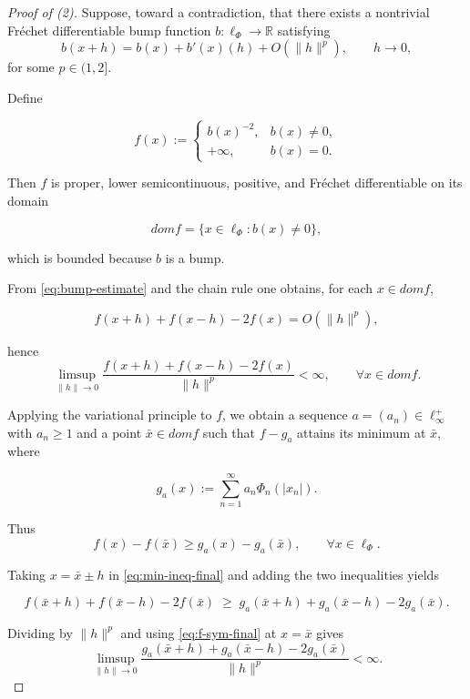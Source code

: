 \documentclass[12pt]{article}
\theoremstyle{thmstyleone}%
\theoremstyle{thmstyletwo}%
\theoremstyle{thmstylethree}%
\begin{document}
{ 

{%
  
\begin{proof}[Proof of (2)]
Suppose, toward a contradiction, that there exists a nontrivial
Fr\'echet differentiable bump function $b:\ell_\Phi\to\mathbb R$
satisfying
\begin{equation}\label{eq:bump-estimate}
  b(x+h)=b(x)+b'(x)(h)+O(\|h\|^p),
  \qquad h\to 0,
\end{equation}
for some $p\in(1,2]$.

Define


\[
  f(x):=
  \begin{cases}
    b(x)^{-2}, & b(x)\neq 0,\\[1mm]
    +\infty, & b(x)=0.
  \end{cases}
\]


Then $f$ is proper, lower semicontinuous, positive, and Fr\'echet
differentiable on its domain


\[
dom f=\{x\in\ell_\Phi : b(x)\neq 0\},
\]


which is bounded because $b$ is a bump.

From \eqref{eq:bump-estimate} and the chain rule one obtains, for each
$x\in dom f$,


\[
  f(x+h)+f(x-h)-2f(x)=O(\|h\|^p),
\]


hence
\begin{equation}\label{eq:f-sym-final}
  \limsup_{\|h\|\to 0}
  \frac{f(x+h)+f(x-h)-2f(x)}{\|h\|^p}<\infty,
  \qquad \forall x\in dom f.
\end{equation}

Applying the variational principle to $f$, we obtain a sequence
$a=(a_n)\in\ell_\infty^+$ with $a_n\ge 1$ and a point
$\bar x\in  dom f$ such that $f-g_a$ attains its minimum at $\bar x$,
where


\[
  g_a(x):=\sum_{n=1}^\infty a_n\Phi_n(|x_n|).
\]


Thus
\begin{equation}\label{eq:min-ineq-final}
  f(x)-f(\bar x)\ge g_a(x)-g_a(\bar x),
  \qquad \forall x\in\ell_\Phi.
\end{equation}

Taking $x=\bar x\pm h$ in \eqref{eq:min-ineq-final} and adding the two
inequalities yields


\[
  f(\bar x+h)+f(\bar x-h)-2f(\bar x)
  \;\ge\;
  g_a(\bar x+h)+g_a(\bar x-h)-2g_a(\bar x).
\]


Dividing by $\|h\|^p$ and using \eqref{eq:f-sym-final} at $x=\bar x$
gives
\begin{equation}\label{eq:g-sym-bounded-final}
  \limsup_{\|h\|\to 0}
  \frac{g_a(\bar x+h)+g_a(\bar x-h)-2g_a(\bar x)}{\|h\|^p}<\infty.
\end{equation}


\end{proof}}}
\end{document}
